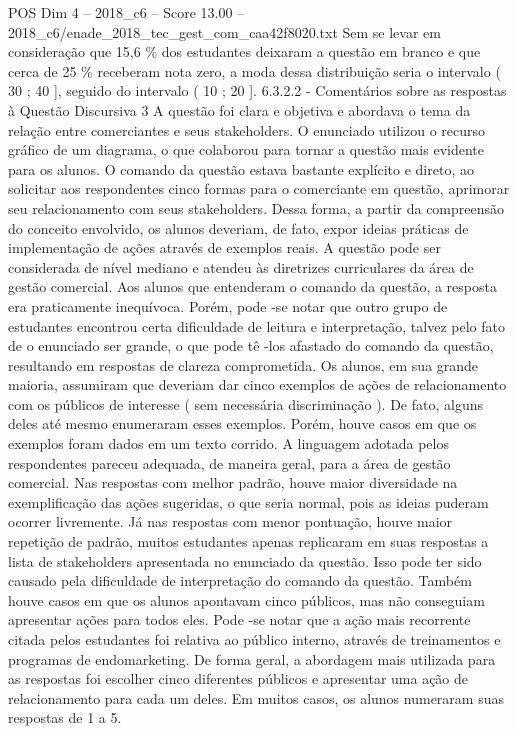 \begin{textsample}{POS Dim 4 – 2018\_c6 – Score 13.00 – 2018\_c6/enade\_2018\_tec\_gest\_com\_caa42f8020.txt}
Sem se levar em consideração que 15,6 \% dos estudantes deixaram a questão em branco e que cerca de 25 \% receberam nota zero, a moda dessa distribuição seria o intervalo ( 30 ; 40 ], seguido do intervalo ( 10 ; 20 ]. 6.3.2.2 - Comentários sobre as respostas à Questão Discursiva 3 A questão foi clara e objetiva e abordava o tema da relação entre comerciantes e seus stakeholders.
O enunciado utilizou o recurso gráfico de um diagrama, o que colaborou para tornar a questão mais evidente para os alunos.
O comando da questão estava bastante explícito e direto, ao solicitar aos respondentes cinco formas para o comerciante em questão, aprimorar seu relacionamento com seus stakeholders.
Dessa forma, a partir da compreensão do conceito envolvido, os alunos deveriam, de fato, expor ideias práticas de implementação de ações através de exemplos reais.
A questão pode ser considerada de nível mediano e atendeu às diretrizes curriculares da área de gestão comercial.
Aos alunos que entenderam o comando da questão, a resposta era praticamente inequívoca.
Porém, pode -se notar que outro grupo de estudantes encontrou certa dificuldade de leitura e interpretação, talvez pelo fato de o enunciado ser grande, o que pode tê -los afastado do comando da questão, resultando em respostas de clareza comprometida.
Os alunos, em sua grande maioria, assumiram que deveriam dar cinco exemplos de ações de relacionamento com os públicos de interesse ( sem necessária discriminação ).
De fato, alguns deles até mesmo enumeraram esses exemplos.
Porém, houve casos em que os exemplos foram dados em um texto corrido.
A linguagem adotada pelos respondentes pareceu adequada, de maneira geral, para a área de gestão comercial.
Nas respostas com melhor padrão, houve maior diversidade na exemplificação das ações sugeridas, o que seria normal, pois as ideias puderam ocorrer livremente.
Já nas respostas com menor pontuação, houve maior repetição de padrão, muitos estudantes apenas replicaram em suas respostas a lista de stakeholders apresentada no enunciado da questão.
Isso pode ter sido causado pela dificuldade de interpretação do comando da questão.
Também houve casos em que os alunos apontavam cinco públicos, mas não conseguiam apresentar ações para todos eles.
Pode -se notar que a ação mais recorrente citada pelos estudantes foi relativa ao público interno, através de treinamentos e programas de endomarketing.
De forma geral, a abordagem mais utilizada para as respostas foi escolher cinco diferentes públicos e apresentar uma ação de relacionamento para cada um deles.
Em muitos casos, os alunos numeraram suas respostas de 1 a 5.

\end{textsample}
